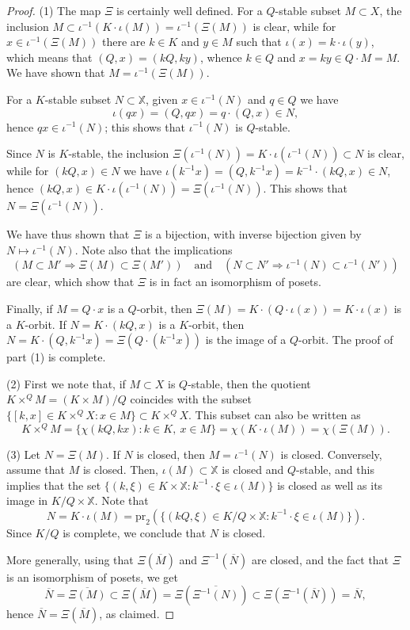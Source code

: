 \documentclass[11pt]{article}
\theoremstyle{definition}
\numberwithin{equation}{section}
\begin{document}
\begin{proof}
(1) The map $\Xi$ is certainly well defined.
For a $Q$-stable subset $M\subset X$,
the inclusion $M\subset\iota^{-1}(K\cdot\iota(M))=\iota^{-1}(\Xi(M))$ is clear, while for $x\in\iota^{-1}(\Xi(M))$ there are $k\in K$ and $y\in M$ such that $\iota(x)=k\cdot\iota(y)$, which means that $(Q,x)=(kQ,ky)$, whence $k\in Q$ and $x=ky\in Q\cdot M=M$. We have shown that $M=\iota^{-1}(\Xi(M))$.

For a $K$-stable subset $N\subset \mathbb{X}$,
given $x\in \iota^{-1}(N)$ and $q\in Q$ we have
\[\iota(qx)=(Q,qx)=q\cdot (Q,x)\in N,\]
hence $qx\in\iota^{-1}(N)$; this shows that $\iota^{-1}(N)$ is $Q$-stable.

Since $N$ is $K$-stable, the inclusion $\Xi(\iota^{-1}(N))=K\cdot \iota(\iota^{-1}(N))\subset N$ is clear, while for $(kQ,x)\in N$ we have
$\iota(k^{-1}x)=(Q,k^{-1}x)=k^{-1}\cdot(kQ,x)\in N$, hence $(kQ,x)\in K\cdot\iota(\iota^{-1}(N))=\Xi(\iota^{-1}(N))$. This shows that $N=\Xi(\iota^{-1}(N))$.

We have thus shown that $\Xi$ is a bijection, with inverse bijection given by $N\mapsto \iota^{-1}(N)$. Note also that the implications
\[(M\subset M'\Rightarrow \Xi(M)\subset\Xi(M'))\quad\mbox{and}\quad (N\subset N'\Rightarrow \iota^{-1}(N)\subset\iota^{-1}(N'))\]
are clear, which show that $\Xi$ is in fact an isomorphism of posets.

Finally, if $M=Q\cdot x$ is a $Q$-orbit, then $\Xi(M)=K\cdot(Q\cdot\iota(x))=K\cdot \iota(x)$ is a $K$-orbit. If $N=K\cdot(kQ,x)$ is a $K$-orbit, then $N=K\cdot(Q,k^{-1}x)=\Xi(Q\cdot(k^{-1}x))$ is the image of a $Q$-orbit. The proof of part (1) is complete.



(2) First we note that, if $M\subset X$ is $Q$-stable, then the quotient $K\times^QM=(K\times M)/Q$ coincides with the subset $\{[k,x]\in K\times^QX:x\in M\}\subset K\times^QX$. This subset can also be written as
\[K\times^QM=\{\chi(kQ,kx):k\in K,\ x\in M\}=\chi(K\cdot\iota(M))=\chi(\Xi(M)).\]

(3) Let $N=\Xi(M)$. If $N$ is closed, then $M=\iota^{-1}(N)$ is closed.
Conversely, assume that $M$ is closed.
Then, $\iota(M)\subset \mathbb{X}$ is closed and $Q$-stable, and this implies that
the set $\{(k,\xi)\in K\times\mathbb{X}:k^{-1}\cdot \xi\in\iota(M)\}$ is closed as well as its image in $K/Q\times\mathbb{X}$. Note that
\[N=K\cdot \iota(M)=\mathrm{pr}_2(\{(kQ,\xi)\in K/Q\times\mathbb{X}:k^{-1}\cdot \xi\in\iota(M)\}).\]
Since $K/Q$ is complete, we conclude that $N$ is closed.




More generally, using that $\Xi(\overline{M})$ and $\Xi^{-1}(\overline{N})$ are closed, and the fact that $\Xi$ is an isomorphism of posets, we get
\[\overline{N}=\overline{\Xi(M)}\subset\Xi(\overline{M})=\Xi(\overline{\Xi^{-1}(N)})\subset\Xi(\Xi^{-1}(\overline{N}))=\overline{N},\]
hence $\overline{N}=\Xi(\overline{M})$, as claimed.\end{proof}
\end{document}
